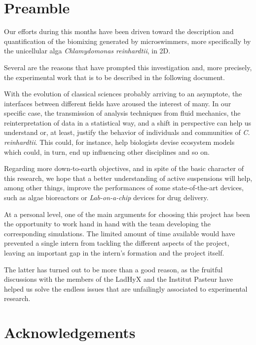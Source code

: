 \chapter*{Preamble}
\thispagestyle{empty}
Our efforts during this months have been driven toward the description and quantification of the biomixing generated by microswimmers, more specifically by the unicellular alga \textit{Chlamydomonas reinhardtii}, in 2D.

Several are the reasons that have prompted this investigation and, more precisely, the experimental work that is to be described in the following document.

With the evolution of classical sciences probably arriving to an asymptote, the interfaces between different fields have aroused the interest of many. In our specific case, the transmission of analysis techniques from fluid mechanics, the reinterpretation of data in a statistical way, and a shift in perspective can help us understand or, at least, justify the behavior of individuals and communities of \textit{C. reinhardtii}. This could, for instance, help biologists devise ecosystem models which could, in turn, end up influencing other disciplines and so on.

Regarding more down-to-earth objectives, and in spite of the basic character of this research, we hope that a better understanding of active suspensions will help, among other things, improve the performances of some state-of-the-art devices, such as algae bioreactors or \textit{Lab-on-a-chip} devices for drug delivery.

At a personal level, one of the main arguments for choosing this project has been the opportunity to work hand in hand with the team developing the corresponding simulations. The limited amount of time available would have prevented a single intern from tackling the different aspects of the project, leaving an important gap in the intern's formation and the project itself.

The latter has turned out to be more than a good reason, as the fruitful discussions with the members of the LadHyX and the Institut Pasteur have helped us solve the endless issues that are unfailingly associated to experimental research.

\cleardoublepage %

\chapter*{Acknowledgements}

